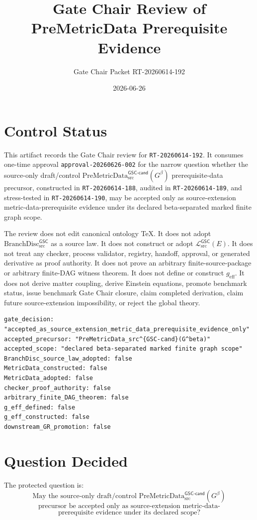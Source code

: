 \documentclass[11pt]{article}
\title{Gate Chair Review of PreMetricData Prerequisite Evidence}
\author{Gate Chair Packet RT-20260614-192}
\date{2026-06-26}
\newcommand{\BranchDisc}{\mathrm{BranchDisc}_{\mathrm{src}}^{\mathsf{GSC}}}
\newcommand{\PreMetricData}{\mathrm{PreMetricData}_{\mathrm{src}}^{\mathsf{GSC\mbox{-}cand}}}
\newcommand{\Gbeta}{G^{\beta}}
\newcommand{\MetricData}{\mathcal{L}_{\mathrm{src}}^{\mathsf{GSC}}}
\newcommand{\geff}{g_{\mathrm{eff}}}
\begin{document}
\maketitle

\section{Control Status}

This artifact records the Gate Chair review for \texttt{RT-20260614-192}. It
consumes one-time approval \texttt{approval-20260626-002} for the narrow
question whether the source-only draft/control
\(\PreMetricData(\Gbeta)\) prerequisite-data precursor, constructed in
\texttt{RT-20260614-188}, audited in \texttt{RT-20260614-189}, and
stress-tested in \texttt{RT-20260614-190}, may be accepted only as
source-extension metric-data-prerequisite evidence under its declared
beta-separated marked finite graph scope.

The review does not edit canonical ontology TeX. It does not adopt
\(\BranchDisc\) as a source law. It does not construct or adopt
\(\MetricData(E)\). It does not treat any checker, process validator, registry,
handoff, approval, or generated derivative as proof authority. It does not
prove an arbitrary finite-source-package or arbitrary finite-DAG witness
theorem. It does not define or construct \(\geff\). It does not derive matter
coupling, derive Einstein equations, promote benchmark status, issue benchmark
Gate Chair closure, claim completed derivation, claim future source-extension
impossibility, or reject the global theory.

\begin{verbatim}
gate_decision: "accepted_as_source_extension_metric_data_prerequisite_evidence_only"
accepted_precursor: "PreMetricData_src^{GSC-cand}(G^beta)"
accepted_scope: "declared beta-separated marked finite graph scope"
BranchDisc_source_law_adopted: false
MetricData_constructed: false
MetricData_adopted: false
checker_proof_authority: false
arbitrary_finite_DAG_theorem: false
g_eff_defined: false
g_eff_constructed: false
downstream_GR_promotion: false
\end{verbatim}

\section{Question Decided}

The protected question is:
\[
\text{May the source-only draft/control }\PreMetricData(\Gbeta)
\]
\[
\text{precursor be accepted only as source-extension metric-data-}
\]
\[
\text{prerequisite evidence under its declared scope?}
\]
\end{document}
